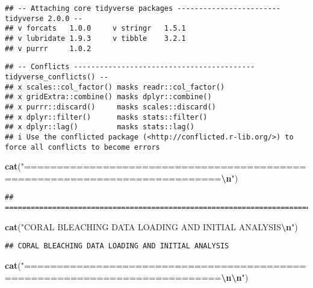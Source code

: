 \documentclass[
]{article}
\newenvironment{Shaded}{\begin{snugshade}}{\end{snugshade}}
\newcommand{\FunctionTok}[1]{\textcolor[rgb]{0.13,0.29,0.53}{\textbf{#1}}}
\newcommand{\NormalTok}[1]{#1}
\newcommand{\SpecialCharTok}[1]{\textcolor[rgb]{0.81,0.36,0.00}{\textbf{#1}}}
\newcommand{\StringTok}[1]{\textcolor[rgb]{0.31,0.60,0.02}{#1}}
\begin{document}
\begin{verbatim}
## -- Attaching core tidyverse packages ------------------------ tidyverse 2.0.0 --
## v forcats   1.0.0     v stringr   1.5.1
## v lubridate 1.9.3     v tibble    3.2.1
## v purrr     1.0.2
\end{verbatim}

\begin{verbatim}
## -- Conflicts ------------------------------------------ tidyverse_conflicts() --
## x scales::col_factor() masks readr::col_factor()
## x gridExtra::combine() masks dplyr::combine()
## x purrr::discard()     masks scales::discard()
## x dplyr::filter()      masks stats::filter()
## x dplyr::lag()         masks stats::lag()
## i Use the conflicted package (<http://conflicted.r-lib.org/>) to force all conflicts to become errors
\end{verbatim}

\begin{Shaded}
\begin{Highlighting}[]
\FunctionTok{cat}\NormalTok{(}\StringTok{"============================================================================}\SpecialCharTok{\textbackslash{}n}\StringTok{"}\NormalTok{)}
\end{Highlighting}
\end{Shaded}

\begin{verbatim}
## ============================================================================
\end{verbatim}

\begin{Shaded}
\begin{Highlighting}[]
\FunctionTok{cat}\NormalTok{(}\StringTok{"CORAL BLEACHING DATA LOADING AND INITIAL ANALYSIS}\SpecialCharTok{\textbackslash{}n}\StringTok{"}\NormalTok{)}
\end{Highlighting}
\end{Shaded}

\begin{verbatim}
## CORAL BLEACHING DATA LOADING AND INITIAL ANALYSIS
\end{verbatim}

\begin{Shaded}
\begin{Highlighting}[]
\FunctionTok{cat}\NormalTok{(}\StringTok{"============================================================================}\SpecialCharTok{\textbackslash{}n\textbackslash{}n}\StringTok{"}\NormalTok{)}
\end{Highlighting}
\end{Shaded}
\end{document}

